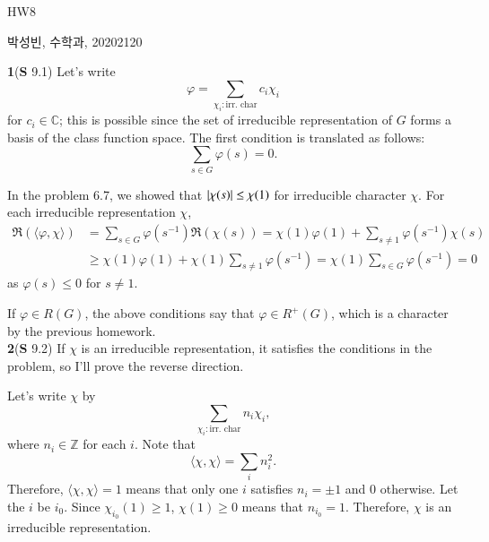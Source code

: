 \documentclass[a4paper, 12pt]{article}
\theoremstyle{Mydefinition}
\theoremstyle{Mytheorem}
\begin{document}
\thispagestyle{myfirstpage}
\begin{center}
	\Large{HW8}
\end{center}
박성빈, 수학과, 20202120

\noindent \textbf{1}(\textbf{S} 9.1) Let's write
\begin{equation}
    \varphi = \sum_{\chi_i:\textrm{irr. char}}c_i\chi_i
\end{equation}
for $c_i\in\mathbb{C}$; this is possible since the set of irreducible representation of $G$ forms a basis of the class function space. The first condition is translated as follows:
\begin{equation}
    \sum_{s\in G}\varphi(s) = 0.
\end{equation}

In the problem 6.7, we showed that $\abs{\chi(s)}\leq \chi(1)$ for irreducible character $\chi$. For each irreducible representation $\chi$,
\begin{equation}
\begin{split}
    \Re\left(\langle \varphi, \chi\rangle\right) &= \sum_{s\in G}\varphi(s^{-1})\Re\left(\chi(s)\right)=\chi(1)\varphi(1)+\sum_{s\neq 1}\varphi(s^{-1})\chi(s)\\
    &\geq \chi(1)\varphi(1)+\chi(1)\sum_{s\neq 1}\varphi(s^{-1})=\chi(1)\sum_{s\in G}\varphi(s^{-1}) = 0
\end{split}
\end{equation}
as $\varphi(s)\leq 0$ for $s\neq 1$.

If $\varphi\in R(G)$, the above conditions say that $\varphi\in R^+(G)$, which is a character by the previous homework.\\

\noindent \textbf{2}(\textbf{S} 9.2)
If $\chi$ is an irreducible representation, it satisfies the conditions in the problem, so I'll prove the reverse direction. 

Let's write $\chi$ by
\begin{equation}
    \sum_{\chi_i:\textrm{irr. char}} n_i\chi_i,
\end{equation}
where $n_i\in\mathbb{Z}$ for each $i$. Note that
\begin{equation}
    \langle \chi, \chi\rangle = \sum_{i} n_i^2.
\end{equation}
Therefore, $\langle\chi, \chi\rangle = 1$ means that only one $i$ satisfies $n_i=\pm 1$ and $0$ otherwise. Let the $i$ be $i_0$. Since $\chi_{i_0}(1)\geq 1$, $\chi(1)\geq 0$ means that $n_{i_0}= 1$. Therefore, $\chi$ is an irreducible representation.\\
\end{document}

